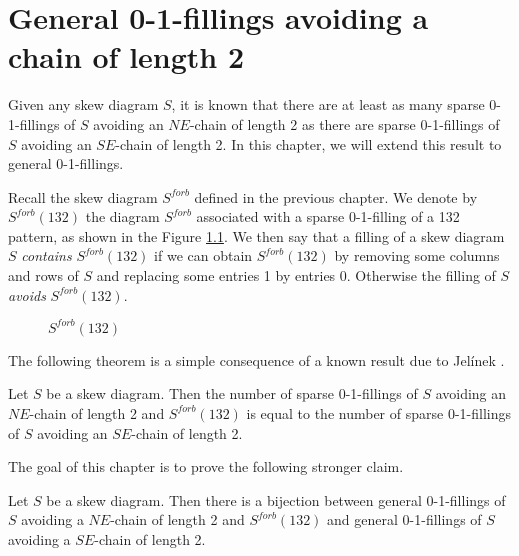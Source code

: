 \chapter{General 0-1-fillings avoiding a chain of length 2}

Given any skew diagram $S$, it is known that there are at least as many sparse 0-1-fillings of $S$ avoiding an $NE$-chain
of length 2 as there are sparse 0-1-fillings of $S$ avoiding an $SE$-chain of length 2. In this chapter,
we will extend this result to general 0-1-fillings.

Recall the skew diagram $S^{forb}$ defined in the previous chapter. We denote by $S^{forb}(132)$ the diagram $S^{forb}$
associated with a sparse 0-1-filling of a 132 pattern, as shown in the Figure \ref{figure_sforb_132}.
We then say that a filling of a skew diagram $S$ \emph{contains} $S^{forb}(132)$ if we can obtain $S^{forb}(132)$ by
removing some columns and rows of $S$ and replacing some entries 1 by entries 0. Otherwise the filling of $S$ \emph{avoids} $S^{forb}(132)$.

\begin{figure}[h]
\centering
{}
\caption{$S^{forb}(132)$}
\label{figure_sforb_132}
\end{figure}

The following theorem is a simple consequence of a known result due to Jelínek \cite[Lemmas 29 and 30]{Jelinek08}.
\begin{thm}\label{thm_1}
Let $S$ be a skew diagram. Then the number of sparse 0-1-fillings of $S$ avoiding an $NE$-chain of length 2 and $S^{forb}(132)$
is equal to the number of sparse 0-1-fillings of $S$ avoiding an $SE$-chain of length 2.
\end{thm}

The goal of this chapter is to prove the following stronger claim.
\begin{thm} \label{thm_2}
Let $S$ be a skew diagram. Then there is a bijection between general 0-1-fillings of $S$ avoiding a $NE$-chain of length 2 and $S^{forb}(132)$
and general 0-1-fillings of $S$ avoiding a $SE$-chain of length 2.
\end{thm}

